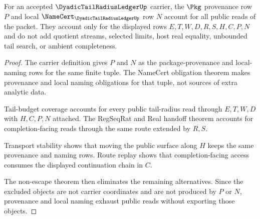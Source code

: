 \begin{theorem}
\label{thm:dyadic-tail-radius-ledger-provenance-exhaustion}
For an accepted $\DyadicTailRadiusLedgerUp$ carrier, the $\Pkg$ provenance row $P$ and local $\NameCert_{\DyadicTailRadiusLedgerUp}$ row $N$ account for all public reads of the packet. They account only for the displayed rows $E,T,W,D,R,S,H,C,P,N$ and do not add quotient streams, selected limits, host real equality, unbounded tail search, or ambient completeness.
\end{theorem}
\begin{proof}
The carrier definition gives $P$ and $N$ as the package-provenance and local-naming rows for the same finite tuple. The NameCert obligation theorem makes provenance and local naming obligations for that tuple, not sources of extra analytic data.

Tail-budget coverage accounts for every public tail-radius read through $E,T,W,D$ with $H,C,P,N$ attached. The RegSeqRat and Real handoff theorem accounts for completion-facing reads through the same route extended by $R,S$.

Transport stability shows that moving the public surface along $H$ keeps the same provenance and naming rows. Route replay shows that completion-facing access consumes the displayed continuation chain in $C$.

The non-escape theorem then eliminates the remaining alternatives. Since the excluded objects are not carrier coordinates and are not produced by $P$ or $N$, provenance and local naming exhaust public reads without exporting those objects.
\end{proof}

